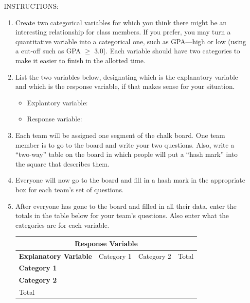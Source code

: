 \documentclass[twoside,openany]{tufte-book}
\begin{document}
\noindent INSTRUCTIONS:
\begin{enumerate}[leftmargin=1cm, itemsep=.2em]
\item Create two categorical variables for which you think there might be an interesting relationship for class members. If you prefer, you may turn a quantitative variable into a categorical one, such as GPA---high or low (using a cut-off such as GPA $\geq$ 3.0). Each variable should have two categories to make it easier to finish in the allotted time.
\item List the two variables below, designating which is the explanatory variable and which is the response variable, if that makes sense for your situation. 

\renewcommand{\labelitemi}{$\filledsquare$}
	\begin{itemize}[leftmargin=1cm, itemsep=.2em]
	\item Explantory variable:
	\vspace{.05\textheight}
	\item Response variable:
	\vspace{.05\textheight}
	\end{itemize}
\item Each team will be assigned one segment of the chalk board. One team member is to go to the board and write your two questions. Also, write a ``two-way'' table on the board in which people will put a ``hash mark'' into the square that describes them.
\item Everyone will now go to the board and fill in a hash mark in the appropriate box for each team's set of questions. 
\item After everyone has gone to the board and filled in all their data, enter the totals in the table below for your team's questions. Also enter what the categories are for each variable. \\ 

\begin{table}
\begin{center}
\begin{tabular}{|l|c|c|c|}
\multicolumn{4}{c}{\hspace{1.8in} Response Variable}\\
\hline
\textbf{Explanatory Variable} & Category 1 & Category 2 & Total\\[.2em]
  \hline
\textbf{Category 1} & & & \\[.6em]
\hline
\textbf{Category 2} & & & \\[.6em]
\hline
Total & & & \\[.6em]
\hline
\end{tabular}
\end{center}
\end{table}
\newpage



\end{enumerate}
\end{document}

